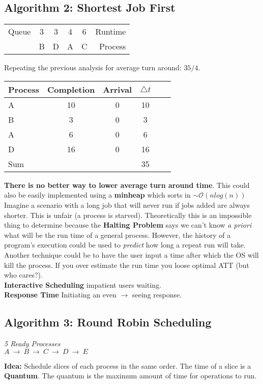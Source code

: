 \documentclass[../base_file/cs1550_notes.tex]{subfiles}
\begin{document}
\subsection{Algorithm 2: Shortest Job First}
\begin{center}
\begin{tabular}{l*{4}{c}r}
Queue		& 3 & 3 & 4 & 6 & Runtime\\
			& B & D & A & C & Process\\
\end{tabular}
\end{center}
Repeating the previous analysis for average turn around: $35/4$.\\
\begin{center}
\begin{tabular}{l*{4}{c}r}
Process		& Completion	& Arrival	& $\bigtriangleup t$\\
\hline
A			& 10			& 0			& 10\\
B			& 3				& 0			& 3\\
A			& 6				& 0			& 6\\
D			& 16 			& 0			& 16\\
\hline
Sum			&			    &	 		& 35\\
\end{tabular}
\end{center}
\textbf{There is no better way to lower average turn around time}\@.  This could also be easily
implemented using a \textbf{minheap} which sorts in $\sim\mathcal{O}(nlog(n))$\\

Imagine a scenario with a long job that will never run if jobs added are always shorter\@. This
is unfair (a process is starved)\@.  Theoretically this is an impossible thing to determine
because the \textbf{Halting Problem} says we can't know \textit{a priori} what will be the run time 
of a general process\@.  However, the history of a program's execution could be used to \textit{predict}
how long a repeat run will take\@.  Another technique could be to have the user input a time after which
the OS will kill the process\@.  If you over estimate the run time you loose optimal ATT (but who cares?)\@.\\

\textbf{Interactive Scheduling} impatient users waiting.\\
\textbf{Response Time} Initiating an even $\rightarrow$ seeing response.\\

\subsection{Algorithm 3: Round Robin Scheduling}
\begin{center}
\textit{5 Ready Processes}\\
$A\ \rightarrow\ B\ \rightarrow\ C\ \rightarrow\ D\ \rightarrow\ E$
\end{center}
\textbf{Idea:} Schedule slices of each process in the same order\@.  The time of a slice is a \textbf{Quantum}\@.
The quantum is the maximum amount of time for operations to run\@.\\
\end{document}
